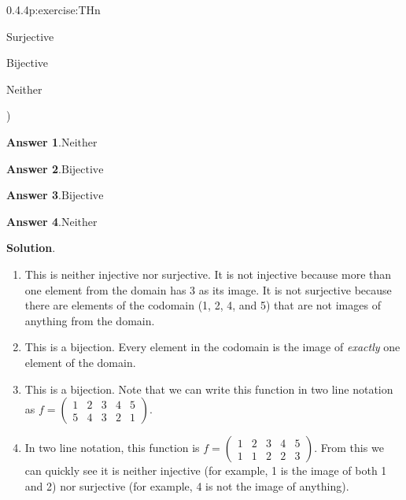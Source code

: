 \documentclass[twoside,11pt,]{book}
\newcommand{\blocktitlefont}{\relax}
\numberwithin{equation}{chapter}
\newcommand{\twoline}[2]{\begin{pmatrix}#1 \\ #2 \end{pmatrix}}
\newcommand{\amp}{&}
\begin{document}
\begin{divisionsolution}{0.4.4}{}{p:exercise:THn}
\begin{enumerate}[label=(\alph*)]
\begin{itemize*}[label=$\square$,leftmargin=3em,itemjoin=\hspace{1em}]
\item{}Surjective%

\item{}Bijective%

\item{}Neither%

\end{itemize*})\quad
%
\end{enumerate}
%
\par\smallskip%
\noindent\textbf{\blocktitlefont Answer 1}.\quad{}\(\text{Neither}\)%
\par\smallskip%
\noindent\textbf{\blocktitlefont Answer 2}.\quad{}\(\text{Bijective}\)%
\par\smallskip%
\noindent\textbf{\blocktitlefont Answer 3}.\quad{}\(\text{Bijective}\)%
\par\smallskip%
\noindent\textbf{\blocktitlefont Answer 4}.\quad{}\(\text{Neither}\)%
\par\smallskip%
\noindent\textbf{\blocktitlefont Solution}.\quad{}%
\begin{enumerate}[label=(\alph*)]
\item{}This is neither injective nor surjective. It is not injective because more than one element from the domain has 3 as its image. It is not surjective because there are elements of the codomain (1, 2, 4, and 5) that are not images of anything from the domain.%
\item{}This is a bijection. Every element in the codomain is the image of \emph{exactly} one element of the domain.%
\item{}This is a bijection. Note that we can write this function in two line notation as \(f = \twoline{1 \amp 2 \amp 3 \amp 4 \amp 5}{5 \amp 4 \amp 3 \amp 2 \amp 1}\text{.}\)%
\item{}In two line notation, this function is \(f = \twoline{1 \amp 2 \amp 3 \amp 4 \amp 5}{1 \amp 1 \amp 2 \amp 2 \amp 3}\text{.}\) From this we can quickly see it is neither injective (for example, 1 is the image of both 1 and 2) nor surjective (for example, 4 is not the image of anything).%
\end{enumerate}
%
\end{divisionsolution}%
\end{document}
